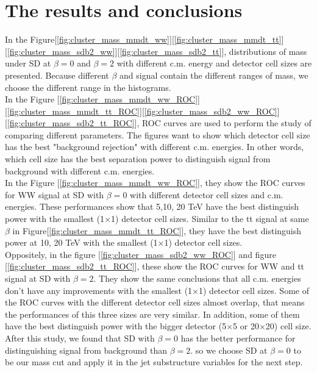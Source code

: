 \documentclass[final,1p,11pt]{elsarticle}
\begin{document}
\section{The results and conclusions}
In the Figure[\ref{fig:cluster_mass_mmdt_ww}][\ref{fig:cluster_mass_mmdt_tt}][\ref{fig:cluster_mass_sdb2_ww}][\ref{fig:cluster_mass_sdb2_tt}], distributions of mass under SD at  $\beta=0$ and $\beta=2$ with different c.m. energy and detector cell sizes are presented. Because different $\beta$ and signal contain the different ranges of mass, we choose the different range in the histograms.\\

In the Figure [\ref{fig:cluster_mass_mmdt_ww_ROC}][\ref{fig:cluster_mass_mmdt_tt_ROC}][\ref{fig:cluster_mass_sdb2_ww_ROC}][\ref{fig:cluster_mass_sdb2_tt_ROC}], ROC curves are used to perform the study of comparing different parameters. The figures want to show which detector cell size has the best "background rejection" with different c.m. energies. In other words, which cell size has the best separation power to distinguish signal from background with different c.m. energies.\\

In the Figure [\ref{fig:cluster_mass_mmdt_ww_ROC}], they show the ROC curves for WW signal at SD with $\beta=0$  with different detector cell sizes and c.m. energies. These performances show that 5,10, 20 TeV have the best distinguish power with the smallest (1$\times$1) detector cell sizes. Similar to the tt signal at same $\beta$ in Figure[\ref{fig:cluster_mass_mmdt_tt_ROC}], they have the best distinguish power at 10, 20 TeV with the smallest (1$\times$1) detector cell sizes.\\

Oppositely, in the figure [\ref{fig:cluster_mass_sdb2_ww_ROC}] and figure [\ref{fig:cluster_mass_sdb2_tt_ROC}], these show the ROC curves for WW and tt signal at SD with $\beta=2$. They show the same conclusions that all c.m. energies don't have any improvements with the smallest (1$\times$1) detector cell sizes. Some of the ROC curves with the different detector cell sizes almost overlap, that means the performances of this three sizes are very similar. In addition, some of them have the best distinguish power with the bigger detector (5$\times$5 or 20$\times$20) cell size. \\

After this study, we found that SD with $\beta=0$ has the better performance for distinguishing signal from background than $\beta=2$. so we choose SD at $\beta=0$ to be our mass cut and apply it in the jet substructure variables for the next step.\\
 
\end{document}

